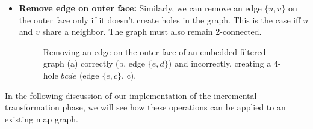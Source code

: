 \begin{itemize}
	\item \textbf{Remove edge on outer face:} Similarly, we can remove an edge $\{u, v\}$ on the outer face only if it doesn't create holes in the graph. This is the case iff $u$ and $v$ share a neighbor. The graph must also remain 2-connected.
\begin{figure}[H]
	\centering
	\quad
	\quad
	\caption{Removing an edge on the outer face of an embedded filtered graph (a) correctly (b, edge $\{e,d\}$) and incorrectly, creating a 4-hole $bcde$ (edge $\{e,c\}$, c).}
	\label{fig:transformation}
\end{figure}
\end{itemize}

In the following discussion of our implementation of the incremental transformation phase, we will see how these operations can be applied to an existing map graph.

\clearpage

